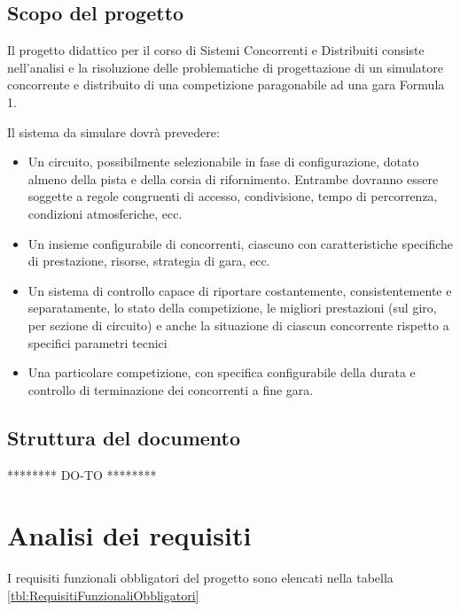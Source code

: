 \documentclass[a4paper,11pt, twoside]{book}
\begin{document}
    \section{Scopo del progetto}
      Il progetto didattico per il corso di Sistemi Concorrenti e Distribuiti consiste nell'analisi e la risoluzione 
      delle problematiche di progettazione di un simulatore concorrente e distribuito 
      di una competizione paragonabile ad una gara Formula 1.

      Il sistema da simulare dovrà prevedere:
      \begin{itemize}
	\item Un circuito, possibilmente selezionabile in fase di configurazione, dotato almeno della pista e della corsia di 
	  rifornimento.
	  Entrambe dovranno essere soggette a regole congruenti di accesso, condivisione, 
	  tempo di percorrenza, condizioni atmosferiche, ecc.
	\item Un insieme configurabile di concorrenti, ciascuno con caratteristiche specifiche di prestazione, risorse, 
	  strategia di gara, ecc.
	\item Un sistema di controllo capace di riportare costantemente, consistentemente e separatamente, 
	  lo stato della competizione, le migliori prestazioni (sul giro, per sezione di circuito) e anche la 
	  situazione di ciascun concorrente rispetto a specifici parametri tecnici
	\item Una particolare competizione, con specifica configurabile della durata e controllo di terminazione 
	  dei concorrenti a fine gara.
      \end{itemize}
    
    \section{Struttura del documento}
      ******** DO-TO ********
  
  \chapter{Analisi dei requisiti}
    I requisiti funzionali obbligatori del progetto sono elencati nella tabella \ref{tbl:RequisitiFunzionaliObbligatori}
    
\end{document}
